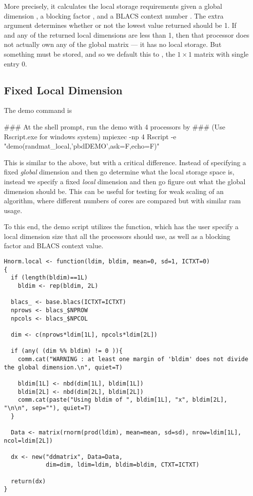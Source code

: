 More precisely, it calculates the local storage requirements given a global dimension , a blocking factor , and a BLACS context number .  The extra argument  determines whether or not the lowest value returned should be 1.  If  and any of the returned local dimensions are less than 1, then that processor does not actually own any of the global matrix --- it has no local storage.  But something must be stored, and so we default this to , the $1\times 1$ matrix with single entry 0.


\subsection{Fixed Local Dimension}

The demo command is
\begin{Command}
### At the shell prompt, run the demo with 4 processors by
### (Use Rscript.exe for windows system)
mpiexec -np 4 Rscript -e "demo(randmat_local,'pbdDEMO',ask=F,echo=F)"
\end{Command}

This is similar to the above, but with a critical difference.  Instead of specifying a fixed \emph{global} dimension and then go determine what the local storage space is, instead we specify a fixed \emph{local} dimension and then go figure out what the global dimension should be.  This can be useful for testing for weak scaling of an algorithm, where different numbers of cores are compared but with similar ram usage.

To this end, the demo script utilizes the  function, which has the user specify a local dimension size that all the processors should use, as well as a blocking factor and BLACS context value.  

\begin{lstlisting}[language=rr,title=Hnrom.local()]
Hnorm.local <- function(ldim, bldim, mean=0, sd=1, ICTXT=0)
{
  if (length(bldim)==1L)
    bldim <- rep(bldim, 2L)
  
  blacs_ <- base.blacs(ICTXT=ICTXT)
  nprows <- blacs_$NPROW
  npcols <- blacs_$NPCOL
  
  dim <- c(nprows*ldim[1L], npcols*ldim[2L])
  
  if (any( (dim %% bldim) != 0 )){
    comm.cat("WARNING : at least one margin of 'bldim' does not divide the global dimension.\n", quiet=T)
    
    bldim[1L] <- nbd(dim[1L], bldim[1L])
    bldim[2L] <- nbd(dim[2L], bldim[2L])
    comm.cat(paste("Using bldim of ", bldim[1L], "x", bldim[2L], "\n\n", sep=""), quiet=T)
  }
  
  Data <- matrix(rnorm(prod(ldim), mean=mean, sd=sd), nrow=ldim[1L], ncol=ldim[2L])
  
  dx <- new("ddmatrix", Data=Data,
            dim=dim, ldim=ldim, bldim=bldim, CTXT=ICTXT)
  
  return(dx)
}
\end{lstlisting}

